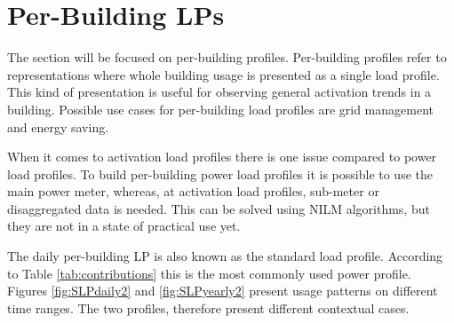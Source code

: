 \section{Per-Building LPs}
\label{sec:per_building}
The section will be focused on per-building profiles.
Per-building profiles refer to representations where whole building usage is presented as a single load profile.
This kind of presentation is useful for observing general activation trends in a building.
Possible use cases for per-building load profiles are grid management and energy saving.

When it comes to activation load profiles there is one issue compared to power load profiles.
To build per-building power load profiles it is possible to use the main power meter, whereas, at activation load profiles, sub-meter or disaggregated data is needed.
This can be solved using NILM algorithms, but they are not in a state of practical use yet.

The daily per-building LP is also known as the standard load profile. 
According to Table \ref{tab:contributions} this is the most commonly used power profile.
Figures \ref{fig:SLPdaily2} and \ref{fig:SLPyearly2} present usage patterns on different time ranges. 
The two profiles, therefore present different contextual cases.

